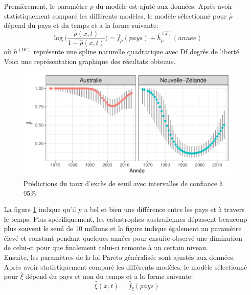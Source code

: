 Premièrement, le paramètre $\rho$ du modèle est ajuté aux données. Après avoir statistiquement comparé les différents modèles, le modèle sélectionné pour $\hat\rho$ dépend du pays et du temps et a la forme suivante:
\begin{equation}\label{eq:3.3.1}
\log\Bigg(\frac{\hat\rho(x,t)}{1-\hat\rho(x,t)}\Bigg) = \hat{f}_\rho(pays) + \hat{h}^{(2)}_\rho(annee)
\end{equation}
où ${h}^{(\text{Df})}$ représente une spline naturelle quadratique avec $\text{Df}$ degrés de liberté.
\\


Voici une représentation graphique des résultats obtenus.
\begin{figure}[h]
\begin{center}
\includegraphics{images/fig-013}
\end{center}
\caption{Prédictions du taux d'excès de seuil avec intervalles de confiance à 95\%}
\label{fig:3.7}
\end{figure}

La figure \ref{fig:3.7} indique qu'il y a bel et bien une différence entre les pays et à travers le temps. Plus spécifiquement, les catastrophes australiennes dépassent beaucoup plus souvent le seuil de 10 millions et la figure indique également un paramètre élevé et constant pendant quelques années pour ensuite observé une diminution de celui-ci pour que finalement celui-ci remonte à un certain niveau.
\\

Ensuite, les paramètres de la loi Pareto généralisée sont ajustés aux données. Après avoir statistiquement comparé les différents modèles, le modèle sélectionné pour $\hat\xi$ dépend du pays et non du temps et a la forme suivante:
\begin{equation}\label{eq:3.3.2}
\hat\xi(x,t) = \hat{f}_\xi(pays)
\end{equation}

